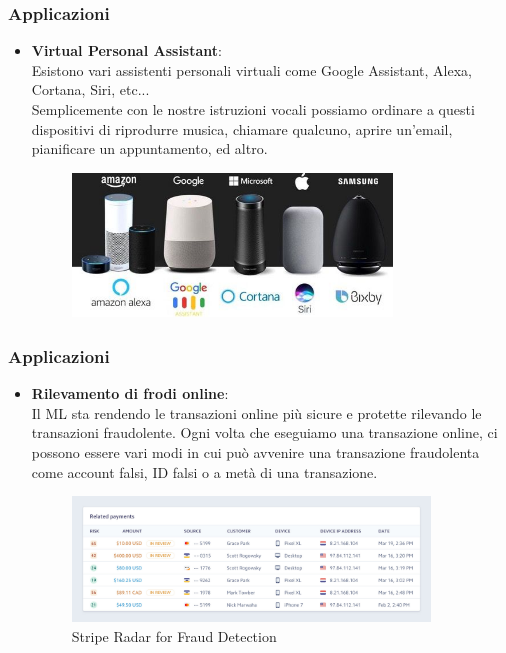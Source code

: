 \begin{frame}
	\frametitle{Applicazioni}
		\begin{itemize}
			\item \textbf{Virtual Personal Assistant}:\\
				Esistono vari assistenti personali virtuali come Google Assistant, Alexa, Cortana, Siri, etc...\\
				Semplicemente con le nostre istruzioni vocali possiamo ordinare a questi dispositivi di riprodurre musica, chiamare qualcuno, aprire un'email, pianificare un appuntamento, ed altro.
				\begin{figure}[!htbp]
					\centering
					\includegraphics[width=8.5cm]{images/intro/assistants-vocaux.jpg}
				\end{figure}
		\end{itemize}		
\end{frame}


\begin{frame}
	\frametitle{Applicazioni}
		\begin{itemize}
			\item \textbf{Rilevamento di frodi online}:\\
				Il ML sta rendendo le transazioni online più sicure e protette rilevando le transazioni fraudolente. Ogni volta che eseguiamo una transazione online, ci possono essere vari modi in cui può avvenire una transazione fraudolenta come account falsi, ID falsi o a metà di una transazione.
				
				\begin{figure}[!htbp]
					\centering
					\includegraphics[width=9.5cm]{images/intro/stripe_radar.jpg}
					\caption{Stripe Radar for Fraud Detection}
				\end{figure}
		\end{itemize}		
\end{frame}



